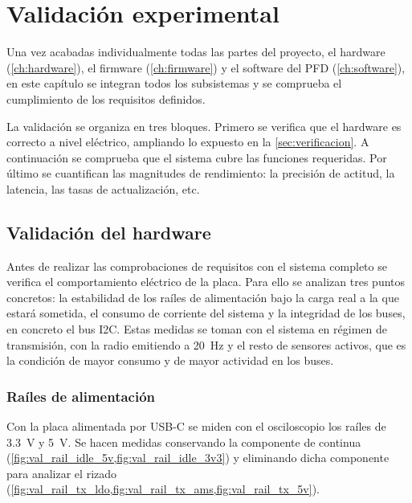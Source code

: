 
\chapter{Validación experimental}
\label{ch:validacion}

Una vez acabadas individualmente todas las partes del proyecto, el hardware
(\cref{ch:hardware}), el firmware (\cref{ch:firmware}) y el software del PFD
(\cref{ch:software}), en este capítulo se integran todos los subsistemas y se
comprueba el cumplimiento de los requisitos definidos.

La validación se organiza en tres bloques. Primero se verifica que el hardware es
correcto a nivel eléctrico, ampliando lo expuesto en la \cref{sec:verificacion}. A
continuación se comprueba que el sistema cubre las funciones requeridas. Por último
se cuantifican las magnitudes de rendimiento: la precisión de actitud, la latencia,
las tasas de actualización, etc.


\section{Validación del hardware}
\label{sec:val_hardware}

Antes de realizar las comprobaciones de requisitos con el sistema completo se
verifica el comportamiento eléctrico de la placa. Para ello se analizan tres puntos
concretos: la estabilidad de los raíles de alimentación bajo la carga real a la que
estará sometida, el consumo de corriente del sistema y la integridad de los buses,
en concreto el bus I2C. Estas medidas se toman con el sistema en régimen de
transmisión, con la radio emitiendo a \SI{20}{\hertz} y el resto de sensores
activos, que es la condición de mayor consumo y de mayor actividad en los buses.

\subsection{Raíles de alimentación}
\label{sec:val_alim}

Con la placa alimentada por USB-C se miden con el osciloscopio los raíles de
\SI{3.3}{\volt} y \SI{5}{\volt}. Se hacen medidas conservando la componente de
continua (\cref{fig:val_rail_idle_5v,fig:val_rail_idle_3v3}) y eliminando dicha
componente para analizar el rizado
(\cref{fig:val_rail_tx_ldo,fig:val_rail_tx_ams,fig:val_rail_tx_5v}).

